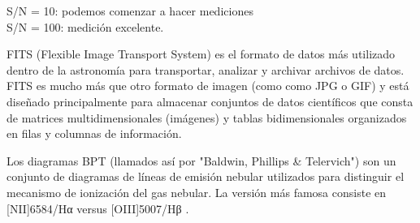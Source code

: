 \documentclass[9pt,twocolumn,a4paper]{opticajnl}
\begin{document}
\begin{description}[style=nextline]
  S/N = 10: podemos comenzar a hacer mediciones\\
  S/N = 100: medición excelente.\\
  \item[Archivos .fits] FITS (Flexible Image Transport System) es el formato de datos más utilizado dentro de la astronomía para transportar, analizar y archivar archivos de datos. FITS es mucho más que otro formato de imagen (como como JPG o GIF) y está diseñado principalmente para almacenar conjuntos de datos científicos que consta de matrices multidimensionales (imágenes) y tablas bidimensionales organizados en filas y columnas de información.
  \item[Diagramas BPT] Los diagramas BPT (llamados así por "Baldwin, Phillips & Telervich") son un conjunto de diagramas de líneas de emisión nebular utilizados para distinguir el mecanismo de ionización del gas nebular. La versión más famosa consiste en [NII]6584/Hα versus [OIII]5007/Hβ \cite{1981PASP...93....5B}.
\end{description}

\printbibliography
\end{document}
